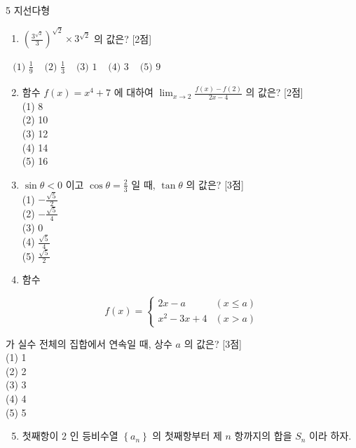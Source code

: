 \documentclass[10pt]{article}
\begin{document}
5 지선다형

\begin{enumerate}
  \item \(\left(\frac{3^{\sqrt{2}}}{3}\right)^{\sqrt{2}} \times 3^{\sqrt{2}}\) 의 값은? [2점]
\end{enumerate}

\(\begin{array}{lllll}\text { (1) } \frac{1}{9} & \text { (2) } \frac{1}{3} & \text { (3) } 1 & \text { (4) } 3 & \text { (5) } 9\end{array}\)

\begin{enumerate}
  \setcounter{enumi}{1}
  \item 함수 \(f(x)=x^{4}+7\) 에 대하여 \(\lim _{x \rightarrow 2} \frac{f(x)-f(2)}{2 x-4}\) 의 값은? [2점]\\
(1) 8\\
(2) 10\\
(3) 12\\
(4) 14\\
(5) 16

  \item \(\sin \theta<0\) 이고 \(\cos \theta=\frac{2}{3}\) 일 때, \(\tan \theta\) 의 값은? [3점]\\
(1) \(-\frac{\sqrt{5}}{2}\)\\
(2) \(-\frac{\sqrt{5}}{4}\)\\
(3) 0\\
(4) \(\frac{\sqrt{5}}{4}\)\\
(5) \(\frac{\sqrt{5}}{2}\)

  \item 함수

\end{enumerate}

\[
f(x)= \begin{cases}2 x-a & (x \leq a) \\ x^{2}-3 x+4 & (x>a)\end{cases}
\]

가 실수 전체의 집합에서 연속일 때, 상수 \(a\) 의 값은? [3점]\\
(1) 1\\
(2) 2\\
(3) 3\\
(4) 4\\
(5) 5

\begin{enumerate}
  \setcounter{enumi}{4}
  \item 첫째항이 2 인 등비수열 \(\left\{a_{n}\right\}\) 의 첫째항부터 제 \(n\) 항까지의 합을 \(S_{n}\) 이라 하자.
\end{enumerate}
\end{document}
